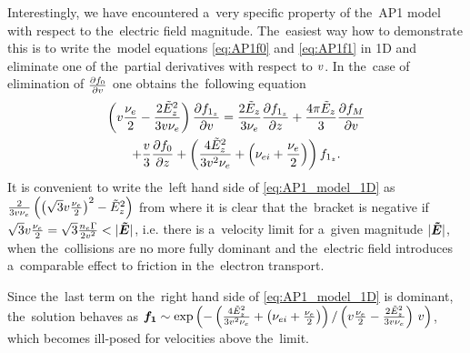 Interestingly, we have encountered a~very specific property of the~AP1 model
with respect to the~electric field magnitude. The~easiest way how to 
demonstrate this is to write the~model equations \eqref{eq:AP1f0} and 
\eqref{eq:AP1f1} in 1D and eliminate one of the~partial derivatives with 
respect to $v$. In the~case of elimination of $\frac{\partial{f_0}}{\partial{v}}$ 
one obtains the~following equation
\begin{multline}
  \left(v\frac{\nu_{e}}{2} - \frac{2\tilde{E}_z^2}{3v\nu_{e}}\right) 
  \frac{\partial{f_{1_z}}}{\partial{v}} 
  =
  \frac{2\tilde{E}_z}{3\nu_{e}}\frac{\partial{f_{1_z}}}{\partial{z}}  
  + \frac{4\pi\tilde{E}_z}{3}\frac{\partial{f_M}}{\partial{v}} \\
  + \frac{v}{3}\frac{\partial{f_0}}{\partial{z}} 
  + \left(\frac{4\tilde{E}_z^2}{3v^2\nu_{e}}
  + \left(\nu_{ei} + \frac{\nu_{e}}{2}\right) \right)f_{1_z} .
  \label{eq:AP1_model_1D}
\end{multline}
It is convenient to write the~left hand side of \eqref{eq:AP1_model_1D} as
$\frac{2}{3v\nu_{e}} 
\left(\left(\sqrt{3}v\frac{\nu_{e}}{2}\right)^2 - \tilde{E}_z^2\right)$
from where it is clear that the~bracket is negative if 
$\sqrt{3}v\frac{\nu_{e}}{2} =  \sqrt{3}\frac{n_e \Gamma}{2v^2} < |\boldsymbol{\tilde{E}}|$, 
i.e. there is a~velocity limit for a~given magnitude $|\boldsymbol{\tilde{E}}|$, 
when the~collisions are no more fully dominant and the~electric field 
introduces a~comparable effect to friction in the~electron transport.

Since the~last term on the~right hand side of \eqref{eq:AP1_model_1D} 
is dominant, the~solution behaves as 
$\boldsymbol{f_1} \sim \exp\left(-\left(\frac{4\tilde{E}_z^2}{3v^2\nu_{e}}
  + \left(\nu_{ei} + \frac{\nu_{e}}{2}\right) \right)/
\left(v\frac{\nu_{e}}{2} - \frac{2\tilde{E}_z^2}{3v\nu_{e}}\right)\, v\right)$, 
which becomes ill-posed for velocities above the~limit.


